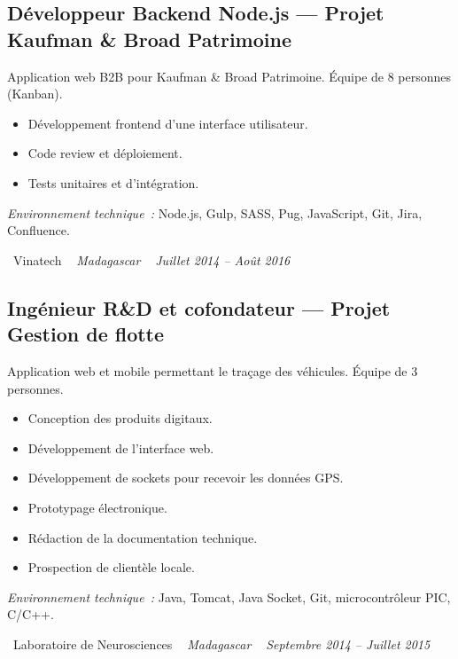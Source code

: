 \documentclass[10pt,a4paper]{article}
\begin{document}
\vspace{6pt}

\subsection*{Développeur Backend Node.js --- Projet Kaufman \& Broad Patrimoine}
\color{darkgray}
Application web B2B pour Kaufman \& Broad Patrimoine. Équipe de 8 personnes (Kanban).
\begin{itemize}
  \item Développement frontend d'une interface utilisateur.
  \item Code review et déploiement.
  \item Tests unitaires et d'intégration.
\end{itemize}
\textit{Environnement technique~:} Node.js, Gulp, SASS, Pug, JavaScript, Git, Jira, Confluence.

\vspace{10pt}

\noindent\textcolor{primary}{ \faBuilding\ Vinatech} \quad
\textit{ \small \textcolor{darkgray}{ \faMapMarker\ } Madagascar } \hfill
\textit{ \small \textcolor{darkgray}{ \faCalendar\ } Juillet 2014 -- Août 2016 }

\vspace{4pt}

\subsection*{Ingénieur R\&D et cofondateur --- Projet Gestion de flotte}
\color{darkgray}
Application web et mobile permettant le traçage des véhicules. Équipe de 3 personnes.
\begin{itemize}
  \item Conception des produits digitaux.
  \item Développement de l'interface web.
  \item Développement de sockets pour recevoir les données GPS.
  \item Prototypage électronique.
  \item Rédaction de la documentation technique.
  \item Prospection de clientèle locale.
\end{itemize}
\textit{Environnement technique~:} Java, Tomcat, Java Socket, Git, microcontrôleur PIC, C/C++.

\vspace{10pt}

\noindent\textcolor{primary}{ \faBuilding\ Laboratoire de Neurosciences} \quad
\textit{ \small \textcolor{darkgray}{ \faMapMarker\ } Madagascar } \hfill
\textit{ \small \textcolor{darkgray}{ \faCalendar\ } Septembre 2014 -- Juillet 2015 }
\end{document}
